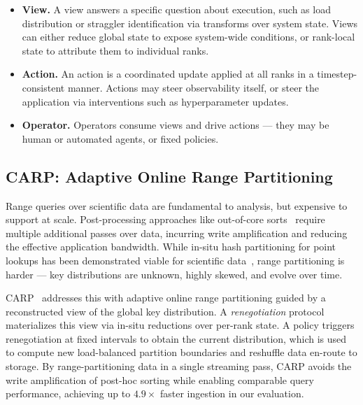 \begin{itemize}[leftmargin=*]
  \item \textbf{View.
        }
        A view answers a specific question about execution, such as load distribution or straggler
        identification via transforms over system state.
        Views can either reduce global state to expose system-wide conditions, or rank-local state to
        attribute them to individual ranks.

  \item \textbf{Action.
        }
        An action is a coordinated update applied at all ranks in a timestep-consistent manner.
        Actions may steer observability itself,
        or steer the application via interventions such as hyperparameter updates.

  \item \textbf{Operator.
        }
        Operators consume views and drive actions --- they may be human or automated agents, or fixed
        policies.
\end{itemize}


\subsection{CARP: Adaptive Online Range Partitioning}
\label{sec:intro:case:carp}

Range queries over scientific data are fundamental to analysis, but expensive to support at scale.
Post-processing approaches like out-of-core sorts~\cite{Rasmu2011:TritonSort} require multiple
additional passes over data,
incurring write amplification and reducing the effective application bandwidth.
While in-situ hash partitioning for point lookups has been demonstrated viable for scientific
data~\cite{Zheng2018:DeltaFS},
range partitioning is harder --- key distributions are unknown, highly skewed, and evolve over
time.

CARP~\cite{Jain2024:CARP} addresses this with adaptive online range partitioning guided by a
reconstructed view of
the global key distribution.
A \emph{renegotiation} protocol materializes this view via in-situ reductions over per-rank state.
A policy triggers renegotiation at fixed intervals to obtain the current distribution, which is
used to compute new load-balanced partition boundaries and reshuffle data en-route to storage.
By range-partitioning data in a single streaming pass,
CARP avoids the write amplification of post-hoc sorting while
enabling comparable query performance, achieving up to $4.9\times$ faster ingestion in our
evaluation.

